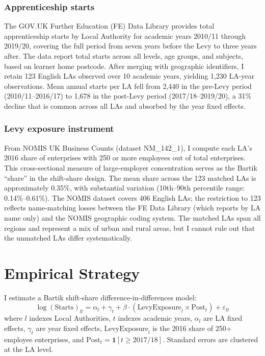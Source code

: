 \documentclass[12pt]{article}
\begin{document}
\subsubsection*{Apprenticeship starts} The GOV.UK Further Education (FE) Data Library provides total apprenticeship starts by Local Authority for academic years 2010/11 through 2019/20, covering the full period from seven years before the Levy to three years after. The data report total starts across all levels, age groups, and subjects, based on learner home postcode. After merging with geographic identifiers, I retain 123 English LAs observed over 10 academic years, yielding 1,230 LA-year observations. Mean annual starts per LA fell from 2,440 in the pre-Levy period (2010/11--2016/17) to 1,678 in the post-Levy period (2017/18--2019/20), a 31\% decline that is common across all LAs and absorbed by the year fixed effects.

\subsubsection*{Levy exposure instrument} From NOMIS UK Business Counts (dataset NM\_142\_1), I compute each LA's 2016 share of enterprises with 250 or more employees out of total enterprises. This cross-sectional measure of large-employer concentration serves as the Bartik ``share'' in the shift-share design. The mean share across the 123 matched LAs is approximately 0.35\%, with substantial variation (10th--90th percentile range: 0.14\%--0.61\%). The NOMIS dataset covers 406 English LAs; the restriction to 123 reflects name-matching losses between the FE Data Library (which reports by LA name only) and the NOMIS geographic coding system. The matched LAs span all regions and represent a mix of urban and rural areas, but I cannot rule out that the unmatched LAs differ systematically.



\section{Empirical Strategy}

I estimate a Bartik shift-share difference-in-differences model:
\begin{equation}
\log(\text{Starts})_{lt} = \alpha_l + \gamma_t + \beta \cdot (\text{LevyExposure}_l \times \text{Post}_t) + \varepsilon_{lt}
\label{eq:main}
\end{equation}
where $l$ indexes Local Authorities, $t$ indexes academic years, $\alpha_l$ are LA fixed effects, $\gamma_t$ are year fixed effects, $\text{LevyExposure}_l$ is the 2016 share of 250+ employee enterprises, and $\text{Post}_t = \mathbf{1}[t \geq 2017/18]$. Standard errors are clustered at the LA level.
\end{document}
